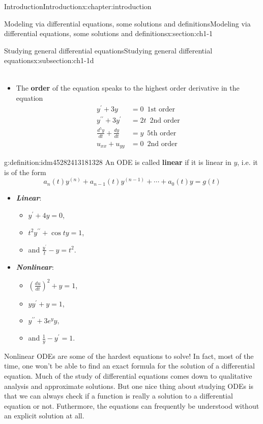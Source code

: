 \documentclass[oneside,10pt,]{book}
\newcommand{\alert}[1]{\textbf{\textit{#1}}}
\newcommand{\terminology}[1]{\textbf{#1}}
\numberwithin{equation}{section}
\numberwithin{equation}{section}
\newcommand{\amp}{&}
\begin{document}
\begin{chapterptx}{Introduction}{}{Introduction}{}{}{x:chapter:introduction}
\begin{sectionptx}{Modeling via differential equations, some solutions and definitions}{}{Modeling via differential equations, some solutions and definitions}{}{}{x:section:ch1-1}
\begin{subsectionptx}{Studying general differential equations}{}{Studying general differential equations}{}{}{x:subsection:ch1-1d}
\begin{itemize}[label=\textbullet]
\begin{align*}
\end{align*}
%
\item{}The \terminology{order} of the equation speaks to the highest order derivative in the equation%
\begin{align*}
y^{\prime}+3y \amp =0\,\,\,\text{1st order}\\
y^{\prime\prime}+3y^{\prime} \amp =2t\,\,\,\text{2nd order}\\
\frac{d^{5}y}{dt}+\frac{dy}{dt} \amp =y\,\,\,\text{5th order}\\
u_{xx}+u_{yy} \amp =0\,\,\,\text{2nd order}
\end{align*}
%
\end{itemize}
\begin{definition}{}{g:definition:idm45282413181328}%
An ODE is called \terminology{linear} if it is linear in \(y\), i.e. it is of the form%
\begin{equation*}
a_{n}(t)y^{(n)}+a_{n-1}(t)y^{(n-1)}+\cdots+a_{0}(t)y=g(t)
\end{equation*}
\end{definition}
%
\begin{itemize}[label=\textbullet]
\item{}\alert{Linear}:%
\begin{itemize}[label=$\circ$]
\item{}\(y^{\prime}+4y=0\),%
\item{}\(t^{2}y^{\prime\prime}+\cos ty=1\),%
\item{}and \(\frac{y^{\prime}}{t}-y=t^{2}\).%
\end{itemize}
%
\item{}\alert{Nonlinear}:%
\begin{itemize}[label=$\circ$]
\item{}\(\left(\frac{du}{dt}\right)^{2}+y=1\),%
\item{}\(yy^{\prime}+y=1\),%
\item{}\(y^{\prime\prime}+3e^{y}y,\)%
\item{}and \(\frac{1}{y}-y^{\prime}=1\).%
\end{itemize}
%
\end{itemize}
Nonlinear ODEs are some of the hardest equations to solve! In fact, most of the time, one won't be able to find an exact formula for the solution of a differential equation. Much of the study of differential equations comes down to qualitative analysis and approximate solutions. But one nice thing about studying ODEs is that we can always check if a function is really a solution to a differential equation or not. Futhermore, the equations can frequently be understood without an explicit solution at all.%

\end{subsectionptx}
\end{sectionptx}
\end{chapterptx}
\end{document}
